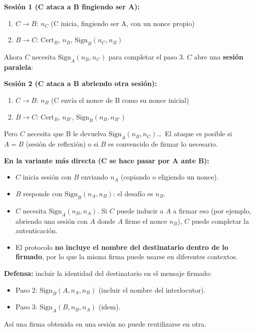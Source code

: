 \documentclass[11pt,a4paper]{article}
\begin{document}
\textbf{Sesión 1 (C ataca a B fingiendo ser A):}
\begin{enumerate}
  \item $C \to B$: $n_C$ (C inicia, fingiendo ser A, con un nonce propio)
  \item $B \to C$: $\text{Cert}_B$, $n_B$, $\text{Sign}_B(n_C, n_B)$
\end{enumerate}
Ahora $C$ necesita $\text{Sign}_A(n_B, n_C)$ para completar el paso 3. $C$ abre una \textbf{sesión paralela}:

\textbf{Sesión 2 (C ataca a B abriendo otra sesión):}
\begin{enumerate}
  \item $C \to B$: \textbf{$n_B$} (C envía el nonce de B como su nonce inicial)
  \item $B \to C$: $\text{Cert}_B$, $n_{B'}$, $\text{Sign}_B(n_B, n_{B'})$
\end{enumerate}
Pero $C$ necesita que B le devuelva $\text{Sign}_A(n_B, n_C)$\ldots\ El ataque es posible si $A=B$ (sesión de reflexión) o si $B$ es convencido de firmar lo necesario.

\textbf{En la variante más directa (C se hace pasar por A ante B):}
\begin{itemize}
  \item $C$ inicia sesión con $B$ enviando $n_A$ (copiando o eligiendo un nonce).
  \item $B$ responde con $\text{Sign}_B(n_A, n_B)$: el desafío es $n_B$.
  \item $C$ necesita $\text{Sign}_A(n_B, n_A)$. Si $C$ puede inducir a $A$ a firmar eso (por ejemplo, abriendo una sesión con $A$ donde $A$ firme el nonce $n_B$), $C$ puede completar la autenticación.
  \item El protocolo \textbf{no incluye el nombre del destinatario dentro de lo firmado}, por lo que la misma firma puede usarse en diferentes contextos.
\end{itemize}

\textbf{Defensa:} incluir la identidad del destinatario en el mensaje firmado:
\begin{itemize}
  \item Paso 2: $\text{Sign}_B(A, n_A, n_B)$ (incluir el nombre del interlocutor).
  \item Paso 3: $\text{Sign}_A(B, n_B, n_A)$ (idem).
\end{itemize}
Así una firma obtenida en una sesión no puede reutilizarse en otra.
\end{document}
